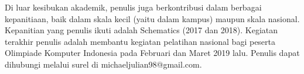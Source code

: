 Di luar kesibukan akademik, penulis juga berkontribusi dalam berbagai kepanitiaan, baik dalam skala kecil (yaitu dalam kampus) maupun skala nasional. Kepanitian yang penulis ikuti adalah Schematics (2017 dan 2018). Kegiatan terakhir penulis adalah membantu kegiatan pelatihan nasional bagi peserta Olimpiade Komputer Indonesia pada Februari dan Maret 2019 lalu. Penulis dapat dihubungi melalui surel di michaeljulian98@gmail.com.

